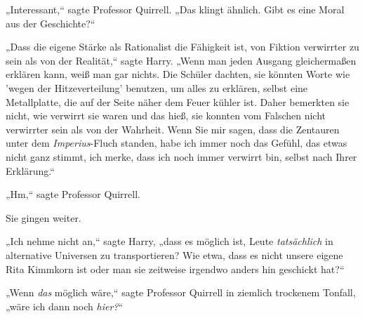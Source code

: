 „Interessant,“ sagte Professor Quirrell. „Das klingt ähnlich. Gibt es eine Moral aus der Geschichte?“

„Dass die eigene Stärke als Rationalist die Fähigkeit ist, von Fiktion verwirrter zu sein als von der Realität,“ sagte Harry. „Wenn man jeden Ausgang gleichermaßen erklären kann, weiß man gar nichts. Die Schüler dachten, sie könnten Worte wie 'wegen der Hitzeverteilung' benutzen, um alles zu erklären, selbst eine Metallplatte, die auf der Seite näher dem Feuer kühler ist. Daher bemerkten sie nicht, wie verwirrt sie waren und das hieß, sie konnten vom Falschen nicht verwirrter sein als von der Wahrheit. Wenn Sie mir sagen, dass die Zentauren unter dem \emph{Imperius}-Fluch standen, habe ich immer noch das Gefühl, das etwas nicht ganz stimmt, ich merke, dass ich noch immer verwirrt bin, selbst nach Ihrer Erklärung.“

„Hm,“ sagte Professor Quirrell.

Sie gingen weiter.

„Ich nehme nicht an,“ sagte Harry, „dass es möglich ist, Leute \emph{tatsächlich} in alternative Universen zu transportieren? Wie etwa, dass es nicht unsere eigene Rita Kimmkorn ist oder man sie zeitweise irgendwo anders hin geschickt hat?“

„Wenn \emph{das} möglich wäre,“ sagte Professor Quirrell in ziemlich trockenem Tonfall, „wäre ich dann noch \emph{hier?}“


